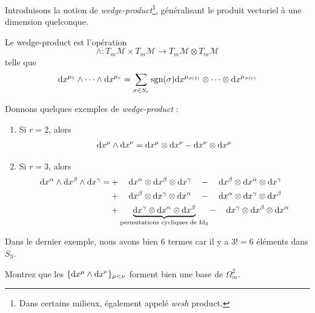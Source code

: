   Introduisons la notion de \emph{wedge-product}\footnote{Dans certains milieux, également appelé \emph{wesh} product.}, généralisant le produit vectoriel à une dimension quelconque.
\begin{theoremframe}
    \begin{defi}
        Le wedge-product est l'opération 
        \begin{equation}
        \wedge : T_m\mathcal{M} \times T_m\mathcal{M} \to T_m \mathcal{M} \otimes T_m\mathcal{M}
        \end{equation}
        telle que
        \begin{equation}
            \mathrm{d} x^{\mu_1}\wedge \cdots\wedge \mathrm{d} x^{\mu_r} = \sum_{\sigma \in S_r} \operatorname{sgn}(\sigma) \mathrm{d} x^{\mu_{\sigma(1)}} \otimes \cdots \otimes \mathrm{d} x^{\mu_{\sigma(r)}}
        \end{equation}
    \end{defi}
\end{theoremframe}
\begin{exmp}
    Donnons quelques exemples de \emph{wedge-product} :
    \begin{enumerate}
        \item Si $r=2$, alors
        \begin{equation}
            \mathrm{d} x^{\mu}\wedge \mathrm{d} x^{\nu} = \mathrm{d} x^{\mu}\otimes \mathrm{d} x^{\nu} - \mathrm{d} x^{\nu}\otimes \mathrm{d} x^{\mu}
        \end{equation}
        \item Si $r=3$, alors
        \begin{align*}
            \mathrm{d} x^{\alpha}\wedge \mathrm{d} x^{\beta}\wedge \mathrm{d} x^{\gamma} =&+\quad \mathrm{d} x^{\alpha}\otimes \mathrm{d} x^{\beta}\otimes \mathrm{d} x^{\gamma} \quad - \quad\mathrm{d} x^{\beta}\otimes\mathrm{d} x^{\alpha}\otimes \mathrm{d} x^{\gamma}\\
            &+ \quad \mathrm{d} x^{\beta}\otimes \mathrm{d} x^{\gamma}\otimes \mathrm{d} x^{\alpha} \quad - \quad \mathrm{d} x^{\alpha}\otimes \mathrm{d} x^{\gamma}\otimes \mathrm{d} x^{\beta} \\
            &+\underbrace{
            \mathrm{d} x^{\gamma}\otimes \mathrm{d} x^{\alpha}\otimes \mathrm{d} x^{\beta}}_{\text{permutations cycliques de $\mathrm{Id}_3$}} - \, \quad
            \mathrm{d} x^{\gamma}\otimes \mathrm{d} x^{\beta}\otimes \mathrm{d} x^{\alpha}
\end{align*}
    \end{enumerate}
\end{exmp}
Dans le dernier exemple, nous avons bien 6 termes car il y a $3! = 6$ éléments dans $S_3$.
\begin{exerc}
    Montrez que les $\{ \mathrm{d} x^{\mu}\wedge \mathrm{d} x^{\nu} \}_{\mu<\nu}$ forment bien une base de $\Omega_m^2$.
\end{exerc}
